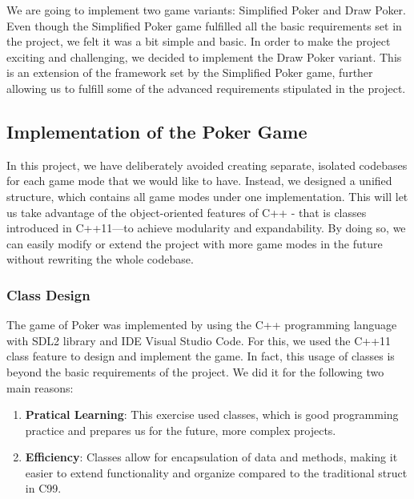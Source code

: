 \hspace{1cm} We are going to implement two game variants: Simplified Poker and Draw Poker. Even though the Simplified Poker game fulfilled all the basic requirements set in the project, we felt it was a bit simple and basic. In order to make the project exciting and challenging, we decided to implement the Draw Poker variant. This is an extension of the framework set by the Simplified Poker game, further allowing us to fulfill some of the advanced requirements stipulated in the project.

\subsection{Implementation of the Poker Game}
\label{subsec:implementation-of-the-poker-game}

\hspace{1cm} In this project, we have deliberately avoided creating separate, isolated codebases for each game mode that we would like to have. Instead, we designed a unified structure, which contains all game modes under one implementation. This will let us take advantage of the object-oriented features of C++ - that is classes introduced in C++11—to achieve modularity and expandability. By doing so, we can easily modify or extend the project with more game modes in the future without rewriting the whole codebase.

\subsubsection{Class Design}
\label{subsubsec:class-design}

\hspace{1cm} The game of Poker was implemented by using the C++ programming language with SDL2 library and IDE Visual Studio Code. For this, we used the C++11 class feature to design and implement the game. In fact, this usage of classes is beyond the basic requirements of the project. We did it for the following two main reasons:
\begin{enumerate}
    \item \textbf{Pratical Learning}: This exercise used classes, which is good programming practice and prepares us for the future, more complex projects.
    \item \textbf{Efficiency}: Classes allow for encapsulation of data and methods, making it easier to extend functionality and organize compared to the traditional struct in C99.
\end{enumerate}

